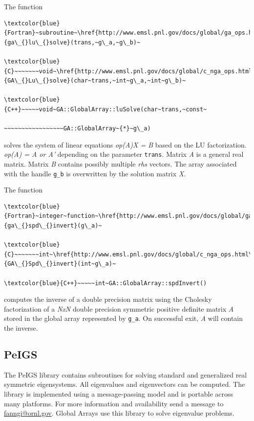 The function
\begin{verbatim}
\textcolor{blue}{Fortran}~subroutine~\href{http://www.emsl.pnl.gov/docs/global/ga_ops.html\#ga_lu_solve}{ga\_{}lu\_{}solve}(trans,~g\_a,~g\_b)~

\textcolor{blue}{C}~~~~~~~void~\href{http://www.emsl.pnl.gov/docs/global/c_nga_ops.html\#ga_lu_solve}{GA\_{}Lu\_{}solve}(char~trans,~int~g\_a,~int~g\_b)~

\textcolor{blue}{C++}~~~~~void~GA::GlobalArray::luSolve(char~trans,~const~

~~~~~~~~~~~~~~~~~GA::GlobalArray~{*}~g\_a)
\end{verbatim}
solves the system of linear equations\emph{ op(A)X = B} based on the
LU factorization. \emph{op(A) = A or A'} depending on the parameter
\texttt{trans}. Matrix\emph{ A} is a general real matrix. Matrix \emph{B}
contains possibly multiple \emph{rhs} vectors. The array associated
with the handle \texttt{g\_b} is overwritten by the solution matrix
\emph{X}.

The function
\begin{verbatim}
\textcolor{blue}{Fortran}~integer~function~\href{http://www.emsl.pnl.gov/docs/global/ga_ops.html\#ga_spd_invert}{ga\_{}spd\_{}invert}(g\_a)~

\textcolor{blue}{C}~~~~~~~int~\href{http://www.emsl.pnl.gov/docs/global/c_nga_ops.html\#ga_spd_invert}{GA\_{}Spd\_{}invert}(int~g\_a)~

\textcolor{blue}{C++}~~~~~int~GA::GlobalArray::spdInvert()
\end{verbatim}
computes the inverse of a double precision matrix using the Cholesky
factorization of a \emph{NxN }double precision symmetric positive
definite matrix \emph{A} stored in the global array represented by
\texttt{g\_a}. On successful exit, \emph{A} will contain the inverse. 


\subsection{PeIGS }

The PeIGS library contains subroutines for solving standard and generalized
real symmetric eigensystems. All eigenvalues and eigenvectors can
be computed. The library is implemented using a message-passing model
and is portable across many platforms. For more information and availability
send a message to \href{mailto:fanngi@ornl.gov}{fanngi@ornl.gov}.
Global Arrays use this library to solve eigenvalue problems.

